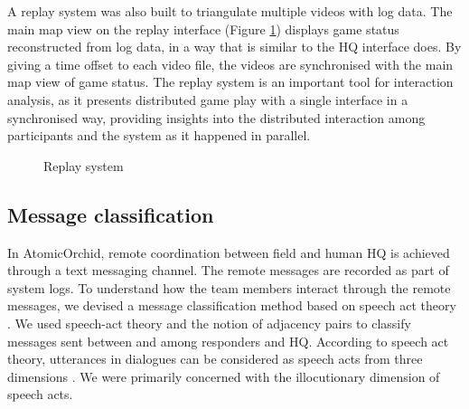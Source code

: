 A replay system was also built to triangulate multiple videos with log data. The main map view on the replay interface (Figure \ref{fig:replay}) displays game status reconstructed from log data, in a way that is similar to the HQ interface does. By giving a time offset to each video file, the videos are synchronised with the main map view of game status. The replay system is an important tool for interaction analysis, as it presents distributed game play with a single interface in a synchronised way, providing insights into the distributed interaction among participants and the system as it happened in parallel. \\

\begin{figure}[H]
  \centering
  
   \caption{Replay system}
  \label{fig:replay}
\end{figure}
\newpage
\subsection{Message classification} \label{sec:aprmsg}
In AtomicOrchid, remote coordination between field and human HQ is achieved through a text messaging channel. The remote messages are recorded as part of system logs. To understand how the team members interact through the remote messages, we devised a message classification method based on speech act theory \cite{Searle1976}. We used speech-act theory and the notion of adjacency pairs \cite{Avrahami} to classify messages sent between and among responders and HQ. According to speech act theory, utterances in dialogues can be considered as speech acts from three dimensions \cite{Searle1976}. We were primarily concerned with the illocutionary dimension of speech acts.\\

